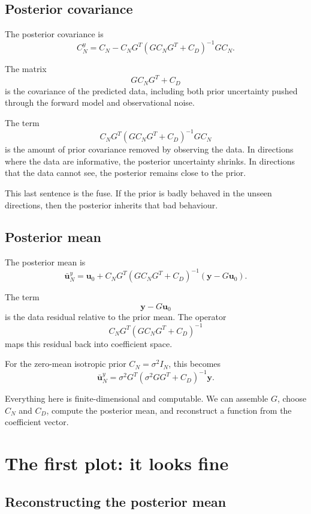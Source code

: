 \documentclass[11pt,a4paper]{book}
\begin{document}
\subsection{Posterior covariance}

The posterior covariance is
\[
    C_N^y
    =
    C_N
    -
    C_N G^T
    \left(
        G C_N G^T + C_D
    \right)^{-1}
    G C_N.
\]

The matrix
\[
    G C_N G^T + C_D
\]
is the covariance of the predicted data, including both prior uncertainty
pushed through the forward model and observational noise.

The term
\[
    C_N G^T
    \left(
        G C_N G^T + C_D
    \right)^{-1}
    G C_N
\]
is the amount of prior covariance removed by observing the data. In directions
where the data are informative, the posterior uncertainty shrinks. In directions
that the data cannot see, the posterior remains close to the prior.

This last sentence is the fuse. If the prior is badly behaved in the unseen
directions, then the posterior inherits that bad behaviour.

\subsection{Posterior mean}

The posterior mean is
\[
    \bar{\bm{u}}_N^y
    =
    \bm{u}_0
    +
    C_N G^T
    \left(
        G C_N G^T + C_D
    \right)^{-1}
    \left(
        \bm{y} - G\bm{u}_0
    \right).
\]

The term
\[
    \bm{y} - G\bm{u}_0
\]
is the data residual relative to the prior mean. The operator
\[
    C_N G^T
    \left(
        G C_N G^T + C_D
    \right)^{-1}
\]
maps this residual back into coefficient space.

For the zero-mean isotropic prior $C_N=\sigma^2 I_N$, this becomes
\[
    \bar{\bm{u}}_N^y
    =
    \sigma^2 G^T
    \left(
        \sigma^2 GG^T + C_D
    \right)^{-1}
    \bm{y}.
\]

Everything here is finite-dimensional and computable. We can assemble $G$,
choose $C_N$ and $C_D$, compute the posterior mean, and reconstruct a function
from the coefficient vector.

\section{The first plot: it looks fine}

\subsection{Reconstructing the posterior mean}
\end{document}

